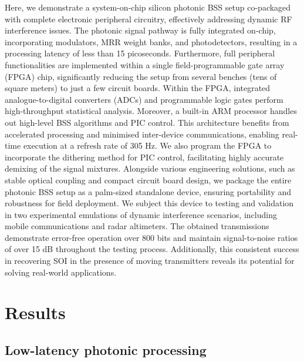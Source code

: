 \documentclass[pdflatex,mathphys]{sty}%
\begin{document}
Here, we demonstrate a system-on-chip silicon photonic BSS setup co-packaged with complete electronic peripheral circuitry, effectively addressing dynamic RF interference issues. The photonic signal pathway is fully integrated on-chip, incorporating modulators, MRR weight banks, and photodetectors, resulting in a processing latency of less than 15 picoseconds. Furthermore, full peripheral functionalities are implemented within a single field-programmable gate array (FPGA) chip, significantly reducing the setup from several benches (tens of square meters) to just a few circuit boards. Within the FPGA, integrated analogue-to-digital converters (ADCs) and programmable logic gates perform high-throughput statistical analysis. Moreover, a built-in ARM processor handles out high-level BSS algorithms and PIC control. This architecture benefits from accelerated processing and minimised inter-device communications, enabling real-time execution at a refresh rate of 305 Hz. We also program the FPGA to incorporate the dithering method for PIC control, facilitating highly accurate demixing of the signal mixtures. Alongside various engineering solutions, such as stable optical coupling and compact circuit board design, we package the entire photonic BSS setup as a palm-sized standalone device, ensuring portability and robustness for field deployment.
We subject this device to testing and validation in two experimental emulations of dynamic interference scenarios, including mobile communications and radar altimeters. The obtained transmissions demonstrate error-free operation over 800 bits and maintain signal-to-noise ratios of over 15 dB throughout the testing process. Additionally, this consistent success in recovering SOI in the presence of moving transmitters reveals its potential for solving real-world applications.

\section{Results}
\subsection{Low-latency photonic processing}
\end{document}
